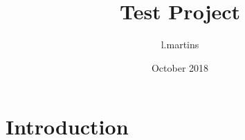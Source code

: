 \documentclass{article}
\title{Test Project}
\author{l.martins }
\date{October 2018}
\begin{document}
\maketitle

\section{Introduction}
\end{document}
